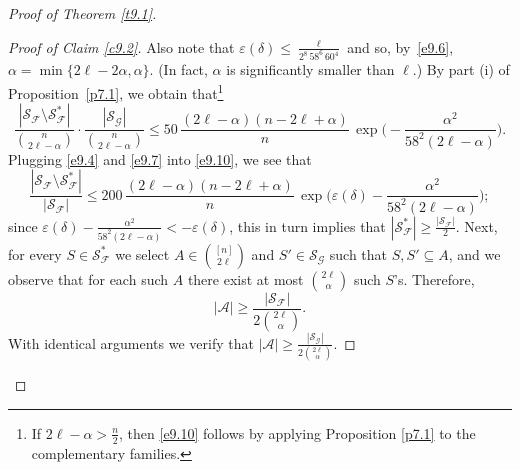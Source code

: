 \documentclass[10pt]{amsart}
\theoremstyle{remark}
\newcommand{\ee}{\varepsilon}
\newcommand{\meg}{\geqslant}
\newcommand{\mik}{\leqslant}
\newcommand{\Fcal}{\mathcal{F}}
\newcommand{\Gcal}{\mathcal{G}}
\newcommand{\Scal}{\mathcal{S}}
\newcommand{\Acal}{\mathcal{A}}
\begin{document}
\begin{proof}[Proof of Theorem \emph{\ref{t9.1}}]
\begin{proof}[Proof of Claim \emph{\ref{c9.2}}]
Also note that $\varepsilon(\delta)\mik \frac{\ell}{2^{8}\, 58^6\, 60^4}$ and so, by~\eqref{e9.6},
$\alpha=\min\{2\ell-2\alpha,\alpha\}$. (In fact, $\alpha$ is significantly smaller than $\ell$.)
By part (i) of Proposition~\ref{p7.1}, we obtain
that\footnote{If $2\ell-\alpha> \frac{n}{2}$, then \eqref{e9.10} follows by applying
Proposition \ref{p7.1} to the complementary families.}
\begin{equation} \label{e9.10}
\frac{|\Scal_{\Fcal}\setminus\Scal^*_{\Fcal}|}{\binom{n}{2\ell-\alpha}}\cdot
\frac{|\Scal_{\Gcal}|}{\binom{n}{2\ell-\alpha}} \mik 50\,
\frac{(2\ell-\alpha)(n-2\ell+\alpha)}{n}\, \exp\Big(-\frac{\alpha^2}{58^2(2\ell-\alpha)}\Big).
\end{equation}
Plugging \eqref{e9.4} and \eqref{e9.7} into \eqref{e9.10}, we see that
\begin{equation} \label{e9.11}
\frac{|\Scal_{\Fcal}\setminus \Scal^*_{\Fcal}|}{|\Scal_{\Fcal}|} \mik
200\, \frac{(2\ell-\alpha)(n-2\ell+\alpha)}{n}\,
\exp\Big(\ee(\delta)-\frac{\alpha^2}{58^2(2\ell-\alpha)}\Big);
\end{equation}
since $\ee(\delta)-\frac{\alpha^2}{58^2(2\ell-\alpha)}<-\ee(\delta)$, this in turn implies that
$|\Scal^*_{\Fcal}|\meg \frac{|\Scal_{\Fcal}|}{2}$. Next, for every $S\in\Scal^*_{\Fcal}$ we select
$A\in\binom{[n]}{2\ell}$ and $S'\in\Scal_{\Gcal}$ such that $S,S'\subseteq A$, and
we observe that for each such $A$ there exist at most $\binom{2\ell}{\alpha}$ such $S$'s. Therefore,
\begin{equation} \label{e9.12}
|\Acal| \meg \frac{|\Scal_{\Fcal}|}{2\binom{2\ell}{\alpha}}.
\end{equation}
With identical arguments we verify that $|\Acal| \meg \frac{|\Scal_{\Gcal}|}{2\binom{2\ell}{\alpha}}$.

\end{proof}
\end{proof}
\end{document}
